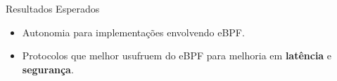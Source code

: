 \begin{frame}{Resultados Esperados}
\begin{itemize}
		\item Autonomia para implementações envolvendo eBPF.
		
		\vspace{30pt}
		
		\item Protocolos que melhor usufruem do eBPF para melhoria em \textbf{latência} e \textbf{segurança}.
	\end{itemize} 
\end{frame}
